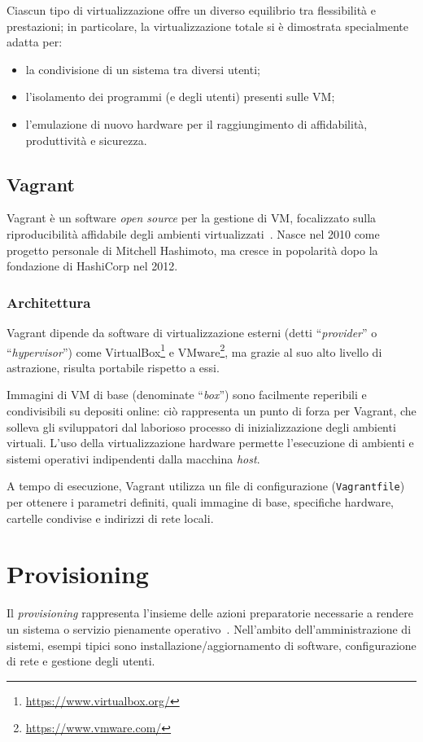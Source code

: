 \documentclass[12pt,a4paper,twoside,openright]{book}
\begin{document}
Ciascun tipo di virtualizzazione offre un diverso equilibrio tra flessibilità e prestazioni; in particolare, la virtualizzazione totale si è dimostrata specialmente adatta per:
\begin{itemize}
    \item la condivisione di un sistema tra diversi utenti;
    \item l'isolamento dei programmi (e degli utenti) presenti sulle \ac{VM};
    \item l'emulazione di nuovo hardware per il raggiungimento di affidabilità, produttività e sicurezza.
\end{itemize}

\subsection{Vagrant}
Vagrant è un software \textit{open source} per la gestione di \ac{VM}, focalizzato sulla riproducibilità affidabile degli ambienti virtualizzati~\cite{vagrantwiki}. Nasce nel 2010 come progetto personale di Mitchell Hashimoto, ma cresce in popolarità dopo la fondazione di HashiCorp nel 2012.

\subsubsection{Architettura}
Vagrant dipende da software di virtualizzazione esterni (detti ``\textit{provider}'' o ``\textit{hypervisor}'') come VirtualBox\footnote{\url{https://www.virtualbox.org/}} e VMware\footnote{\url{https://www.vmware.com/}}, ma grazie al suo alto livello di astrazione, risulta portabile rispetto a essi.

Immagini di \ac{VM} di base (denominate ``\textit{box}'') sono facilmente reperibili e condivisibili su depositi online: ciò rappresenta un punto di forza per Vagrant, che solleva gli sviluppatori dal laborioso processo di inizializzazione degli ambienti virtuali. L'uso della virtualizzazione hardware permette l'esecuzione di ambienti e sistemi operativi indipendenti dalla macchina \textit{host}.

A tempo di esecuzione, Vagrant utilizza un file di configurazione (\texttt{Vagrantfile}) per ottenere i parametri definiti, quali immagine di base, specifiche hardware, cartelle condivise e indirizzi di rete locali.

\section{Provisioning}
Il \textit{provisioning} rappresenta l'insieme delle azioni preparatorie necessarie a rendere un sistema o servizio pienamente operativo~\cite{provisioningwiki}. Nell'ambito dell'amministrazione di sistemi, esempi tipici sono installazione/aggiornamento di software, configurazione di rete e gestione degli utenti.
\end{document}
